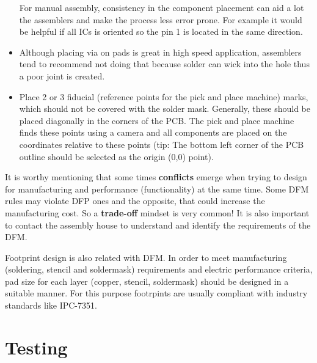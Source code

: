 \documentclass[final]{cubedoc}
\begin{document}
\begin{itemize}
		For manual assembly, consistency in the component placement can aid a lot the assemblers and make the process less error prone. For example it would be helpful if all ICs is oriented so the pin 1 is located in the same direction.
		
		\item Although placing via on pads is great in high speed application, assemblers tend to recommend not doing that because solder can wick into the hole thus a poor joint is created.
		
		
		\item Place 2 or 3 fiducial (reference points for the pick and place machine) marks, which should not be covered with the solder mask. Generally, these should be placed diagonally in the corners of the PCB. The pick and place machine finds these points using a camera and all components are placed on the coordinates relative to these points (tip: The bottom left corner of the PCB outline should be selected as the origin (0,0) point). 
		
		
	\end{itemize}
	
	It is worthy mentioning that some times \textbf{conflicts} emerge when trying to design for manufacturing and performance (functionality) at the same time. Some DFM rules may violate DFP ones and the opposite, that could increase the manufacturing cost. So a \textbf{trade-off} mindset is very common! It is also important to contact the assembly house to understand and identify the requirements of the DFM.
	
	Footprint design is also related with DFM. In order to meet manufacturing (soldering, stencil and soldermask) requirements and electric performance criteria, pad size for each layer (copper, stencil, soldermask) should be designed in a suitable manner. For this purpose footrpints are usually compliant with industry standards like IPC-7351.
	
	\section{Testing}
	
\end{document}

